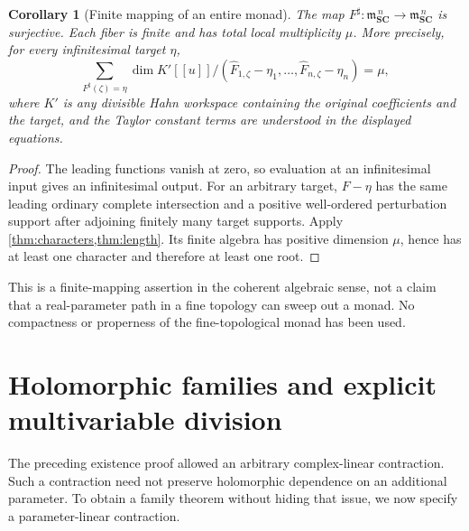 \documentclass[11pt,letterpaper]{article}
\newtheorem{corollary}[theorem]{Corollary}
\theoremstyle{definition}
\theoremstyle{remark}
\newcommand{\SC}{\mathbf{SC}}
\newcommand{\mm}{\mathfrak m}
\newcommand{\sh}{^{\sharp}}
\begin{document}
\begin{corollary}[Finite mapping of an entire monad]\label{cor:monadmap}
The map $F\sh:\mm_{\SC}^{\,n}\to\mm_{\SC}^{\,n}$ is surjective. Each fiber is finite and has total local multiplicity $\mu$. More precisely, for every infinitesimal target $\eta$,
\[
 \sum_{F\sh(\zeta)=\eta}
   \dim K'[[u]]/(\widehat F_{1,\zeta}-\eta_1,\ldots,
                 \widehat F_{n,\zeta}-\eta_n)=\mu,
\]
where $K'$ is any divisible Hahn workspace containing the original coefficients and the target, and the Taylor constant terms are understood in the displayed equations.
\end{corollary}
\begin{proof}
The leading functions vanish at zero, so evaluation at an infinitesimal input gives an infinitesimal output. For an arbitrary target, $F-\eta$ has the same leading ordinary complete intersection and a positive well-ordered perturbation support after adjoining finitely many target supports. Apply \cref{thm:characters,thm:length}. Its finite algebra has positive dimension $\mu$, hence has at least one character and therefore at least one root.
\end{proof}

This is a finite-mapping assertion in the coherent algebraic sense, not a claim that a real-parameter path in a fine topology can sweep out a monad. No compactness or properness of the fine-topological monad has been used.

\section{Holomorphic families and explicit multivariable division}
\label{sec:families}

The preceding existence proof allowed an arbitrary complex-linear contraction. Such a contraction need not preserve holomorphic dependence on an additional parameter. To obtain a family theorem without hiding that issue, we now specify a parameter-linear contraction.
\end{document}
